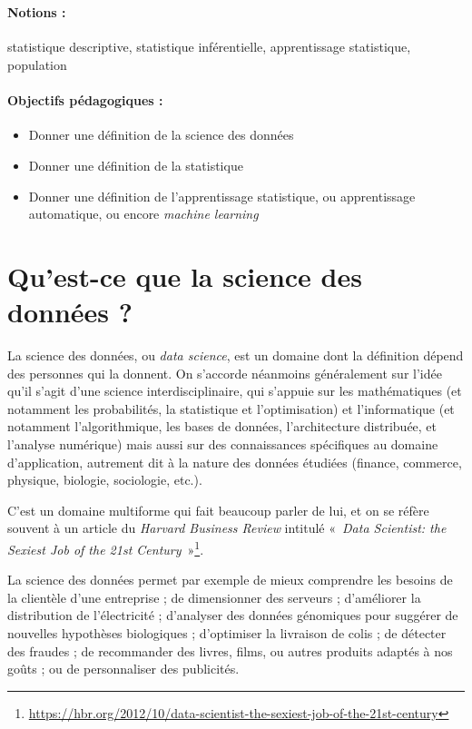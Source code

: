 \label{chap:intro}
\,
\paragraph{Notions :} statistique descriptive, statistique inférentielle,
apprentissage statistique, population

\paragraph{Objectifs pédagogiques :}
\begin{itemize}
	\item Donner une définition de la science des données
	\item Donner une définition de la statistique 
	\item Donner une définition de l'apprentissage statistique, ou apprentissage
	automatique, ou encore \textit{machine learning}
\end{itemize}


\section{Qu'est-ce que la science des données ?}
La science des données, ou \textit{data science}, est un domaine dont la
définition dépend des personnes qui la donnent. On s'accorde néanmoins
généralement sur l'idée qu'il s'agit d'une science interdisciplinaire, qui
s'appuie sur les mathématiques (et notamment les probabilités, la statistique
et l'optimisation) et l'informatique (et notamment l'algorithmique, les bases
de données, l'architecture distribuée, et l'analyse numérique) mais aussi sur
des connaissances spécifiques au domaine d'application, autrement dit à la
nature des données étudiées (finance, commerce, physique, biologie, sociologie,
etc.).

C'est un domaine multiforme qui fait beaucoup parler de lui, et on se réfère
souvent à un article du \textit{Harvard Business Review} intitulé «~\textit{Data Scientist: the Sexiest Job of the 21st Century}~»\footnote{\href{https://hbr.org/2012/10/data-scientist-the-sexiest-job-of-the-21st-century}{https://hbr.org/2012/10/data-scientist-the-sexiest-job-of-the-21st-century}}.

La science des données permet par exemple de mieux comprendre les besoins de la
clientèle d'une entreprise ; de dimensionner des serveurs ; d'améliorer la
distribution de l'électricité ; d'analyser des données génomiques pour suggérer
de nouvelles hypothèses biologiques ; d'optimiser la livraison de colis ; de
détecter des fraudes ; de recommander des livres, films, ou autres produits
adaptés à nos goûts ; ou de personnaliser des publicités.

